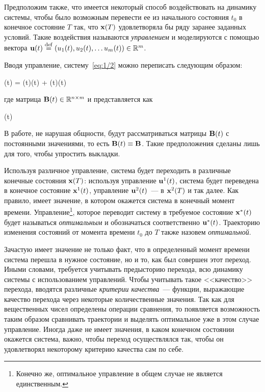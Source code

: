 Предположим также, что имеется некоторый способ воздействовать на динамику системы, чтобы было возможным перевести ее из начального состояния $t_0$ в конечное состояние $T$ так, что $\mathbf{x}(T)$ удовлетворяла бы ряду заранее заданных условий. Такие воздействия называются \emph{управлением} и моделируются с помощью вектора $\mathbf{u}(t) \stackrel{ \mathrm{def} }{=} (u_1(t), u_2(t), \ldots u_m(t)) \in \mathbb{R}^{m}$.

Вводя управление, систему~\ref{eq:1/2} можно переписать следующим образом:

    (t) = (t)(t) + (t)(t) \text{,}
\eeq

где матрица $\mathbf{B}(t) \in \mathbb{R}^{{n} \times {m}}$ и представляется как

\beqn
    (t) \eqdef {} 
\eeqn

В работе, не нарушая общности, будут рассматриваться матрицы $\mathbf{B}(t)$ с постоянными значениями, то есть $\mathbf{B}(t) \equiv \mathbf{B}$. Такие предположения сделаны лишь для того, чтобы упростить выкладки.

Используя различное управление, система будет переходить в различные конечные состояния $\mathbf{x}(T)$: используя управление $\mathbf{u}^1(t)$, система будет переведена в конечное состояние $\mathbf{x}^1(t)$, управление $\mathbf{u}^2(t)$~--- в $\mathbf{x}^2(T)$ и так далее. Как правило, имеет значение, в котором окажется система в конечный момент времени. Управление\footnote{Конечно же, оптимальное управление в общем случае не является единственным.}, которое переводит систему в требуемое состояние $\mathbf{x}^{*}(t)$ будет называться \emph{оптимальным} и обозначаться соответственно $\mathbf{u}^{*}(t)$. Траекторию изменения состояний от момента времени $t_0$ до $T$ также назовем \emph{оптимальной}.

\br

Зачастую имеет значение не только факт, что в определенный момент времени система перешла в нужное состояние, но и то, как был совершен этот переход. Иными словами, требуется учитывать предысторию перехода, всю динамику системы с использованием управлений. Чтобы учитывать такое <<качество>> перехода, вводятся различные \emph{критерии качества}~--- функции, выражающие качество перехода через некоторые количественные значения. Так как для вещественных чисел определены операции сравнения, то появляется возможность таким образом сравнивать траектории и выделять оптимальное уже в этом случае управление. Иногда даже не имеет значения, в каком конечном состоянии окажется система, важно, чтобы переход осуществлялся так, чтобы он удовлетворял некоторому критерию качества сам по себе.


